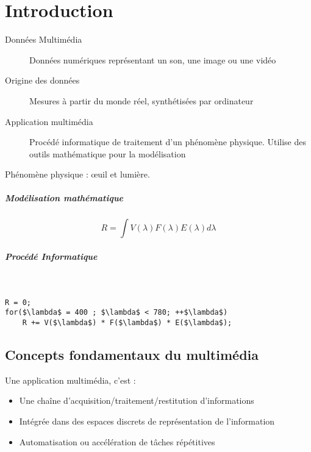\documentclass[12pt,a4paper,openany]{book}
\begin{document}
	\thispagestyle{empty} %
	\titleBC 
	\dominitoc
	\setcounter{tocdepth}{1}
	\setcounter{secnumdepth}{3}
	\setcounter{minitocdepth}{1}
	\tableofcontents
	\chapter{Introduction}
	\begin{description}
		\item[Données Multimédia] Données numériques représentant un son, une image ou une vidéo
		\item[Origine des données] Mesures à partir du monde réel, synthétisées par ordinateur
		\item[Application multimédia] Procédé informatique de traitement d'un phénomène physique. Utilise des outils mathématique pour la modélisation
	\end{description}
\begin{exemple}
	Phénomène physique : \oe{}uil et lumière.

	\paragraph{Modélisation mathématique}$$R = \int V(\lambda)F(\lambda)E(\lambda)d\lambda$$
	\paragraph{Procédé Informatique}
	~
	\begin{lstlisting}[language=Algo,numbers=none,framerule=0pt]
R = 0;
for($\lambda$ = 400 ; $\lambda$ < 780; ++$\lambda$) 
	R += V($\lambda$) * F($\lambda$) * E($\lambda$);
	\end{lstlisting}
\end{exemple}

\section{Concepts fondamentaux du multimédia}
\begin{definition}
Une application multimédia, c'est : 
\begin{itemize}
	\item Une chaîne d'acquisition/traitement/restitution d'informations
	\item Intégrée dans des espaces discrets de représentation de l'information
	\item Automatisation ou accélération de tâches répétitives
\end{itemize}
\end{definition}
\end{document}

